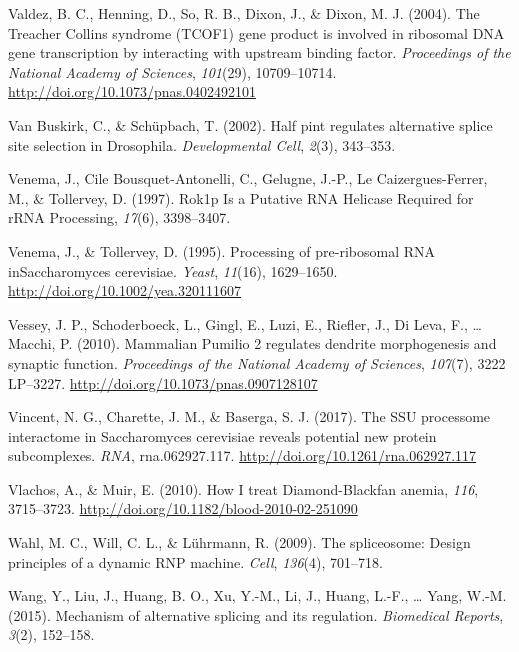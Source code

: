 \documentclass[12pt,oneside]{reedthesis}
\newlength{\cslhangindent}
\newenvironment{cslreferences}%
  {\setlength{\parindent}{0pt}%
  \everypar{\setlength{\hangindent}{\cslhangindent}}\ignorespaces}%
  {\par}
\begin{document}
\begin{cslreferences}
\leavevmode\hypertarget{ref-valdezTreacherCollinsSyndrome2004}{}%
Valdez, B. C., Henning, D., So, R. B., Dixon, J., \& Dixon, M. J. (2004). The Treacher Collins syndrome (TCOF1) gene product is involved in ribosomal DNA gene transcription by interacting with upstream binding factor. \emph{Proceedings of the National Academy of Sciences}, \emph{101}(29), 10709--10714. \url{http://doi.org/10.1073/pnas.0402492101}

\leavevmode\hypertarget{ref-VanBuskirk2002}{}%
Van Buskirk, C., \& Schüpbach, T. (2002). Half pint regulates alternative splice site selection in Drosophila. \emph{Developmental Cell}, \emph{2}(3), 343--353.

\leavevmode\hypertarget{ref-Venema1997}{}%
Venema, J., Cile Bousquet-Antonelli, C., Gelugne, J.-P., Le Caizergues-Ferrer, M., \& Tollervey, D. (1997). Rok1p Is a Putative RNA Helicase Required for rRNA Processing, \emph{17}(6), 3398--3407.

\leavevmode\hypertarget{ref-venemaProcessingPreribosomalRNA1995}{}%
Venema, J., \& Tollervey, D. (1995). Processing of pre-ribosomal RNA inSaccharomyces cerevisiae. \emph{Yeast}, \emph{11}(16), 1629--1650. \url{http://doi.org/10.1002/yea.320111607}

\leavevmode\hypertarget{ref-Vessey2010b}{}%
Vessey, J. P., Schoderboeck, L., Gingl, E., Luzi, E., Riefler, J., Di Leva, F., \ldots{} Macchi, P. (2010). Mammalian Pumilio 2 regulates dendrite morphogenesis and synaptic function. \emph{Proceedings of the National Academy of Sciences}, \emph{107}(7), 3222 LP--3227. \url{http://doi.org/10.1073/pnas.0907128107}

\leavevmode\hypertarget{ref-vincentSSUProcessomeInteractome2017}{}%
Vincent, N. G., Charette, J. M., \& Baserga, S. J. (2017). The SSU processome interactome in Saccharomyces cerevisiae reveals potential new protein subcomplexes. \emph{RNA}, rna.062927.117. \url{http://doi.org/10.1261/rna.062927.117}

\leavevmode\hypertarget{ref-Vlachos2010a}{}%
Vlachos, A., \& Muir, E. (2010). How I treat Diamond-Blackfan anemia, \emph{116}, 3715--3723. \url{http://doi.org/10.1182/blood-2010-02-251090}

\leavevmode\hypertarget{ref-Wahl2009}{}%
Wahl, M. C., Will, C. L., \& Lührmann, R. (2009). The spliceosome: Design principles of a dynamic RNP machine. \emph{Cell}, \emph{136}(4), 701--718.

\leavevmode\hypertarget{ref-Wang2015a}{}%
Wang, Y., Liu, J., Huang, B. O., Xu, Y.-M., Li, J., Huang, L.-F., \ldots{} Yang, W.-M. (2015). Mechanism of alternative splicing and its regulation. \emph{Biomedical Reports}, \emph{3}(2), 152--158.


\end{cslreferences}
\end{document}
